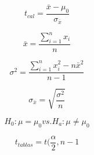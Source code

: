 $$t_{cal} = \frac{\bar{x} - \mu_{0}}{\sigma_{\bar{x}}}$$
   
$$\bar{x} = \frac{\sum_{i=1}^{\mathit{n}} \mathit{x}_{i}}{\mathit{n}}$$

$$\sigma^{2} = \frac{\sum_{i=1}^{\mathit{n}} x_{i}^{2} - \mathit{n}\bar{x}^{2}}{\mathit{n} - 1}$$

$$\sigma_{\bar{x}} = \sqrt{\frac{\sigma^{2}}{n}}$$

$$H_{0}: \mu = \mu_{0} \mathit{ vs. } H_{a}: \mu \not= \mu_{0}$$

$$t_{tablas} = t(\frac{\alpha}{2}, n-1$$